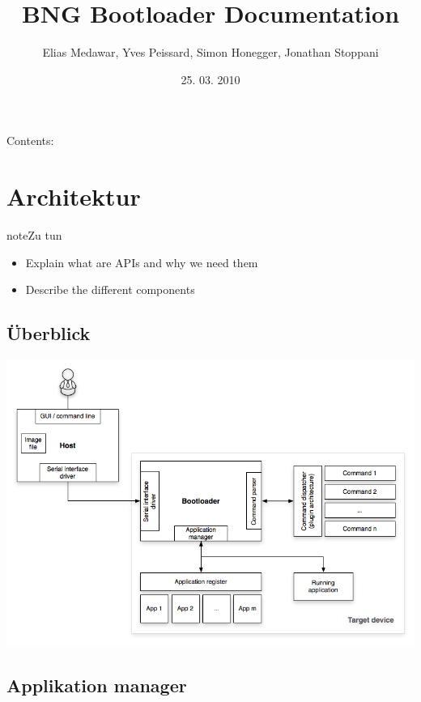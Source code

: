 \documentclass[letterpaper,10pt,ngerman]{manual}
\title{BNG Bootloader Documentation}
\date{25. 03. 2010}
\author{Elias Medawar, Yves Peissard, Simon Honegger, Jonathan Stoppani}
\begin{document}
\maketitle
\tableofcontents
\hypertarget{--doc-index}{}


Contents:

\resetcurrentobjects
\hypertarget{--doc-architecture/index}{}

\chapter{Architektur}
\hypertarget{todo-18}{}
\begin{notice}{note}{Zu tun}
\begin{itemize}
\item {} 
Explain what are APIs and why we need them

\item {} 
Describe the different components

\end{itemize}
\end{notice}


\section{Überblick}

\includegraphics{overview.png}


\section{Applikation manager}
\end{document}
